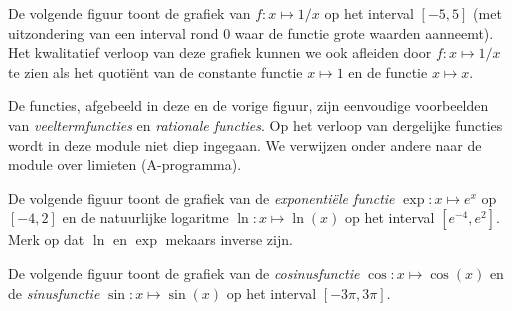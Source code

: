 \documentclass{ximera}
\begin{document}
De volgende figuur toont de grafiek van $f:x\mapsto 1/x$ op het
interval $[-5,5]$ (met uitzondering van een interval rond $0$ waar de
functie grote waarden aanneemt). Het kwalitatief verloop van deze
grafiek kunnen we ook afleiden door $f:x\mapsto 1/x$ te zien als het
quoti\"ent van de constante functie $x\mapsto 1$ en de functie
$x\mapsto x$.

\begin{center}
\end{center}

De functies, afgebeeld in deze en de vorige figuur, zijn eenvoudige
voorbeelden van {\em veeltermfuncties} en {\em rationale functies}. Op
het verloop van dergelijke functies wordt in deze module niet diep
ingegaan. We verwijzen onder andere naar de module over limieten
(A-programma).

De volgende figuur toont de grafiek van de {\em exponenti\"ele functie}
$\exp:x\mapsto e^x$ op $[-4,2]$ en de natuurlijke logaritme
$\ln:x\mapsto \ln(x)$ op het interval $[e^{-4},e^2]$. Merk op dat $\ln$ en
$\exp$ mekaars inverse zijn.

\begin{center}
\end{center}

De volgende figuur toont de grafiek van de {\em cosinusfunctie}
$\cos:x\mapsto \cos(x)$ en de {\em sinusfunctie} $\sin:x\mapsto \sin(x)$ op
het interval $[-3\pi,3\pi]$.
\end{document}
